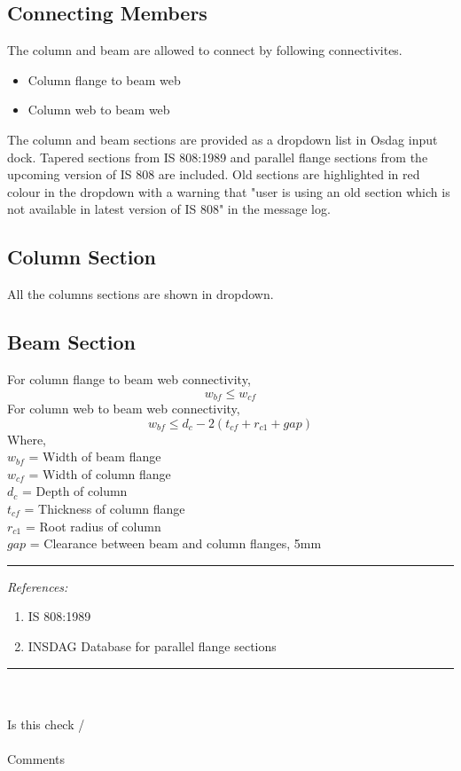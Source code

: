 \documentclass[11.5pt,a4paper,oneside]{report}
\newcommand{\okornot}{ \vspace{15mm} \hrule
	\noindent \\ \\
	Is this check \qquad
	\CheckBox[checked=False, name= ok]{\textbf{Ok}} \qquad / 
	\CheckBox[checked=False, name= notok]{\textbf{Not Ok}}\\ \\
	Comments \\ \\
	\noindent
	\TextField[name=multilinetextbox, multiline=true, width=1.0\linewidth,height=2in]{}}
\newcommand{\checkrefernces} {
	\vspace{15mm} \hrule \vspace{2mm}
	\textit{References:}}
\begin{document}
\begin{Form}
\chapter{Connecting Members}
%
The column and beam are allowed to connect by following connectivites.
\begin{itemize}
	\item Column flange to beam web
	\item Column web to beam web
\end{itemize}
%
The column and beam sections are provided as a dropdown list in Osdag input dock. Tapered sections from IS 808:1989 and parallel flange sections from the upcoming version of IS 808 are included. Old sections are highlighted in red colour in the dropdown with a warning that "user is using an old section which is not available in latest version of IS 808" in the message log.
%
\section{Column Section}
%
All the columns sections are shown in dropdown.
\section{Beam Section}
%
For column flange to beam web connectivity, 
\begin{equation}
	w_{bf} \le w_{cf}
\end{equation}
%
For column web to beam web connectivity,
\begin{equation}
	w_{bf} \le d_c - 2 (t_{cf} + r_{c1} + gap)
\end{equation}
Where, \\
\indent $w_{bf}$ = Width of beam flange \\
\indent $w_{cf}$ =  Width of column flange \\
\indent $d_c$ = Depth of column \\
\indent $t_{cf}$ = Thickness of column flange \\
\indent $r_{c1}$ = Root radius of column \\
\indent $gap$ = Clearance between beam and column flanges, 5mm

\checkrefernces
\begin{enumerate}
	\item IS 808:1989
	\item INSDAG Database for parallel flange sections
\end{enumerate}
\okornot

\end{Form}
\end{document}
